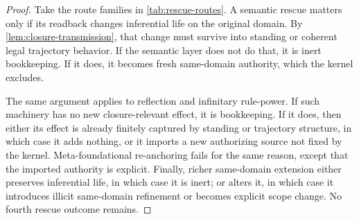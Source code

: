 \begin{proof}
Take the route families in \cref{tab:rescue-routes}. A semantic rescue matters only if its readback changes inferential life on the original domain. By \cref{lem:closure-transmission}, that change must survive into standing or coherent legal trajectory behavior. If the semantic layer does not do that, it is inert bookkeeping. If it does, it becomes fresh same-domain authority, which the kernel excludes.

The same argument applies to reflection and infinitary rule-power. If such machinery has no new closure-relevant effect, it is bookkeeping. If it does, then either its effect is already finitely captured by standing or trajectory structure, in which case it adds nothing, or it imports a new authorizing source not fixed by the kernel. Meta-foundational re-anchoring fails for the same reason, except that the imported authority is explicit. Finally, richer same-domain extension either preserves inferential life, in which case it is inert; or alters it, in which case it introduces illicit same-domain refinement or becomes explicit scope change. No fourth rescue outcome remains.
\end{proof}
